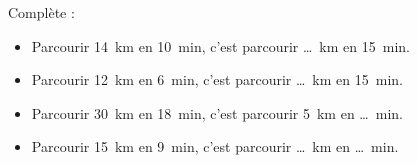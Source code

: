 Complète :
\begin{itemize}
\item Parcourir 14~km en 10~min, c'est parcourir \ldots~km en 15~min.
\item Parcourir 12~km en 6~min, c'est parcourir \ldots~km en 15~min.
\item Parcourir 30~km en 18~min, c'est parcourir 5~km en \ldots~min.
\item Parcourir 15~km en 9~min, c'est parcourir \ldots~km en \ldots~min.
\end{itemize}